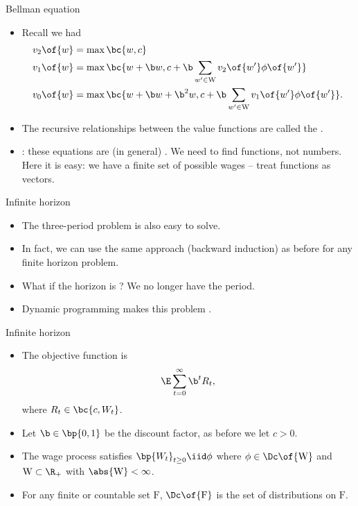 \documentclass[11pt,xcolor={dvipsnames},aspectratio=159,hyperref={pdftex,pdfpagemode=UseNone,hidelinks,pdfdisplaydoctitle=true},usepdftitle=false]{beamer}
\begin{document}
\begin{frame}{Bellman equation}
    \begin{itemize}
    \item Recall we had \begin{align*}
        v_2\of{w} &= \max \bc{w,c} \\
        v_1\of{w} &= \max \bc{w + \b w, c + \b \sum_{w^\prime \in \text{W}} v_2\of{w^\prime} \phi\of{w^\prime}} \\
        v_0\of{w} &= \max \bc{w + \b w + \b^2 w, c + \b \sum_{w^\prime \in \text{W}} v_1\of{w^\prime} \phi\of{w^\prime}}.
    \end{align*}
    \item The recursive relationships between the value functions are called the .
    \item {}: these equations are (in general) . We need to find functions, not numbers. Here it is easy: we have a finite set of possible wages -- treat functions as vectors.
\end{itemize}
\end{frame}

\begin{frame}{Infinite horizon}
    \begin{itemize}
    \item The three-period problem is also easy to solve. 
    \item In fact, we can use the same approach (backward induction) as before for any finite horizon problem.
    \item What if the horizon is ? We no longer have the  period. 
    \item Dynamic programming makes this problem . 
\end{itemize}
\end{frame}

\begin{frame}{Infinite horizon}
    \begin{itemize}
    \item The objective function is \begin{align*}
        \E \sum_{t=0}^\infty \b^t R_t,
    \end{align*} where $R_t \in \bc{c,W_t}$.
    \item Let $\b \in \bp{0,1}$ be the discount factor, as before we let $c>0$.
    \item The wage process satisfies $\bp{W_t}_{t\geq0} \iid \phi$ where $\phi\in \Dc\of{\text{W}}$ and $\text{W} \subset \R_+$ with $\abs{\text{W}} < \infty$.
    \item For any finite or countable set $\text{F}$, $\Dc\of{\text{F}}$ is the set of distributions on $\text{F}$.
\end{itemize}
\end{frame}
\end{document}
